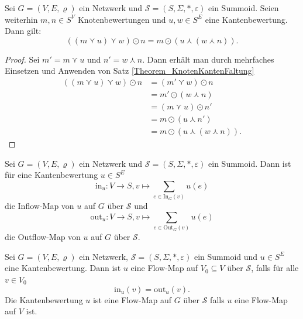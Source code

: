 \documentclass{article}
\begin{document}
\begin{theorem}
  Sei $G = (V, E, \varrho)$ ein Netzwerk und
  $\mathcal{S} = (S, \Sigma, \ast, \varepsilon)$ ein Summoid.
  Seien weiterhin $m, n \in S^V$ Knotenbewertungen und $u, w \in S^E$ eine Kantenbewertung.
  Dann gilt:
  \begin{equation*}
    ((m \curlyvee u) \curlyvee w) \odot n = m \odot (u \curlywedge (w \curlywedge n)).
  \end{equation*}
\end{theorem}
\begin{proof}
  Sei $m' = m \curlyvee u$ und $n' = w \curlywedge n$.
  Dann erhält man durch mehrfaches Einsetzen und Anwenden von Satz \ref{Theorem_KnotenKantenFaltung}
  \begin{align*}
    ((m \curlyvee u) \curlyvee w) \odot n
    &= (m' \curlyvee w) \odot n \\
    &= m' \odot (w \curlywedge n) \\
    &= (m \curlyvee u) \odot n' \\
    &= m \odot (u \curlywedge n') \\
    &= m \odot (u \curlywedge (w \curlywedge n)).
  \end{align*}
\end{proof}

\begin{definition}
  Sei $G = (V, E, \varrho)$ ein Netzwerk und
  $\mathcal{S} = (S, \Sigma, \ast, \varepsilon)$ ein Summoid.
  Dann ist für eine Kantenbewertung $u \in S^E$
  \begin{equation*}
    \text{in}_u \colon V \to S, v \mapsto \sum_{e \in \text{In}_G(v)}u(e)
  \end{equation*} 
  die Inflow-Map von $u$ auf $G$ über $\mathcal{S}$ und
  \begin{equation*}
    \text{out}_u \colon V \to S, v \mapsto \sum_{e \in \text{Out}_G(v)}u(e)
  \end{equation*}
  die Outflow-Map von $u$ auf $G$ über $\mathcal{S}$. 
\end{definition}

\begin{definition}
  Sei $G = (V, E, \varrho)$ ein Netzwerk, 
  $\mathcal{S} = (S, \Sigma, \ast, \varepsilon)$ ein Summoid
  und $u \in S^E$ eine Kantenbewertung.
  Dann ist $u$ eine Flow-Map auf $V_0 \subseteq V$ über $\mathcal{S}$, falls für alle $v \in V_0$
  \begin{equation*}
    \text{in}_u(v) = \text{out}_u(v).
  \end{equation*} 
  Die Kantenbewertung $u$ ist eine Flow-Map auf $G$ über $\mathcal{S}$ falls
  $u$ eine Flow-Map auf $V$ ist.
\end{definition}
\end{document}
